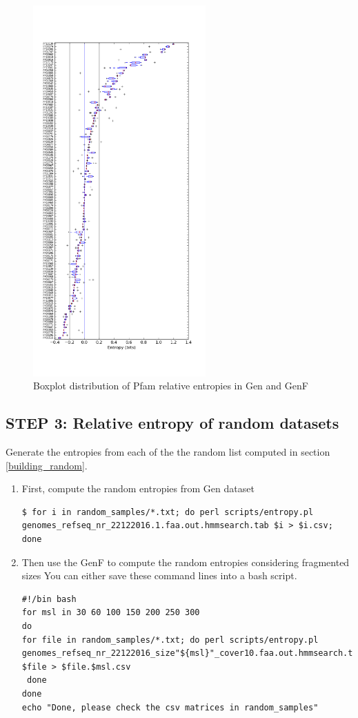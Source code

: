 \documentclass[12pt]{report}
\begin{document}
\begin{enumerate}
\begin{enumerate}
\begin{figure}[H]
  \centering
    \includegraphics[width=250px, scale =0.5]{entropies_matrix_entropies_tab_prof_box.png}
    \caption{Boxplot distribution of Pfam relative entropies in Gen and GenF}
        \label{fig:boxplot}
\end{figure}

\label{random_entropy}
\subsection{STEP 3: Relative entropy of random datasets}
Generate the entropies from each of the the random list computed in section \ref{building_random}. 
\begin{enumerate}
\item First, compute the random entropies from Gen dataset
\begin{verbatim}
$ for i in random_samples/*.txt; do perl scripts/entropy.pl 
genomes_refseq_nr_22122016.1.faa.out.hmmsearch.tab $i > $i.csv;
done 
\end{verbatim}
\item Then use the GenF to compute the random entropies considering fragmented sizes
You can either save these command lines into a bash script. 
\begin{verbatim}
#!/bin bash
for msl in 30 60 100 150 200 250 300 
do  
for file in random_samples/*.txt; do perl scripts/entropy.pl 
genomes_refseq_nr_22122016_size"${msl}"_cover10.faa.out.hmmsearch.tab  
$file > $file.$msl.csv
 done
done
echo "Done, please check the csv matrices in random_samples"  


\end{verbatim}
\end{enumerate}
\end{enumerate}
\end{enumerate}
\end{document}
